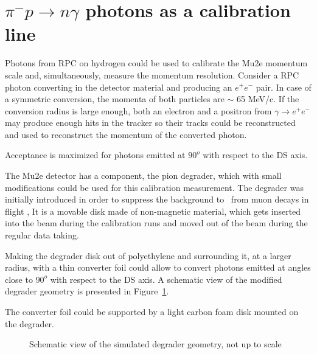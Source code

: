 \section{$\pi^- p \to n \gamma$ photons as a calibration line}

Photons from RPC on hydrogen could be used to calibrate the Mu2e momentum scale and, simultaneously, measure the momentum resolution.
Consider a RPC  photon converting in the detector material 
and producing an $e^+e^-$ pair. In case of a symmetric conversion, the momenta of both particles
are $\sim$ 65 MeV/c. If the conversion radius is large enough, both an electron
and a positron from $\gamma \to e^+ e^-$ may produce enough hits in the tracker
so their tracks could be reconstructed and used to reconstruct the momentum of the
converted photon.

Acceptance is maximized for photons emitted at $90^o$ with respect to the DS axis. 

The Mu2e detector has a component, the pion degrader, which with small modifications
could be used for this calibration measurement. The degrader was initially introduced
in order to suppress the background to \piplusenu\ from muon decays
in flight \cite{MU2E_2527_PIPLUSENU},
It is a movable disk made of non-magnetic material, which gets inserted into
the beam during the calibration runs and moved out of the beam during
the regular data taking.

Making the degrader disk out of polyethylene and surrounding it, at a larger radius, 
with a thin converter foil could allow to convert photons emitted at angles close to $90^o$
with respect to the DS axis. A schematic view of the modified degrader geometry is presented in Figure~\ref{figure:degrader_geometry_v3}.

The converter foil could be supported by a light carbon foam disk mounted on the degrader.

\begin{figure}[H]
  \caption{
    \label{figure:degrader_geometry_v3}
    Schematic view of the simulated degrader geometry, not up to scale
  }
\end{figure}

